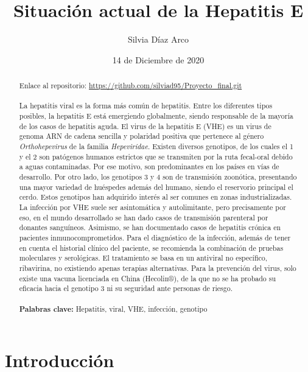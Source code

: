 \documentclass[11 pt]{article}
\title{Situación actual de la Hepatitis E}
\author{Silvia Díaz Arco}
\date{14 de Diciembre de 2020}
\begin{document}
\maketitle
	\begin{abstract}
		Enlace al repositorio: \url{https://github.com/silviad95/Proyecto_final.git}\\\\
		La hepatitis viral es la forma más común de hepatitis. Entre los diferentes tipos posibles, la hepatitis E está emergiendo globalmente, siendo responsable de la mayoría de los casos de hepatitis aguda. El virus de la hepatitis E (VHE) es un virus de genoma ARN de cadena sencilla y polaridad positiva que pertenece al género {\em Orthohepevirus} de la familia {\em Hepeviridae}. Existen diversos genotipos, de los cuales el 1 y el 2 son patógenos humanos estrictos que se transmiten por la ruta fecal-oral debido a aguas contaminadas. Por ese motivo, son predominantes en los países en vías de desarrollo. Por otro lado, los genotipos 3 y 4 son de transmisión zoonótica, presentando una mayor variedad de huéspedes además del humano, siendo el reservorio principal el cerdo. Estos genotipos han adquirido interés al ser comunes en zonas industrializadas. La infección por VHE suele ser asintomática y autolimitante, pero precisamente por eso, en el mundo desarrollado se han dado casos de transmisión parenteral por donantes sanguíneos. Asimismo, se han documentado casos de hepatitis crónica en pacientes inmunocomprometidos. Para el diagnóstico de la infección, además de tener en cuenta el historial clínico del paciente, se recomienda la combinación de pruebas moleculares y serológicas. El tratamiento se basa en un antiviral no específico, ribavirina, no existiendo apenas terapias alternativas. Para la prevención del virus, solo existe una vacuna licenciada en China (Hecolin®), de la que no se ha probado su eficacia hacia el genotipo 3 ni su seguridad ante personas de riesgo.\\\\ 
		{\bf Palabras clave:} Hepatitis, viral, VHE, infección, genotipo	
	\end{abstract}
\tableofcontents
\newpage
\section{Introducción}
\end{document}

